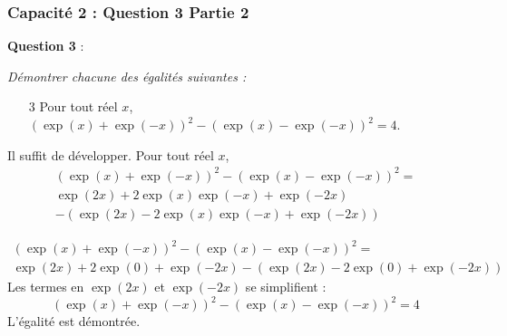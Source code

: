\documentclass[11pt, hyperref={urlcolor=red,%
            linkcolor=blue, %
            colorlinks=true}]{beamer}
\begin{document}
\begin{frame}
\frametitle{Capacité 2 : Question 3 Partie 2}

 \textbf{Question 3} : {\itshape Démontrer chacune des égalités suivantes :
\begin{enumerate}
	\item[3] Pour tout réel $x$, \:  $\left(\exp(x)+ \exp(-x)\right)^2-\left(\exp(x) - \exp(-x)\right)^2=4$.
\end{enumerate} 
}

Il suffit de développer. Pour tout réel $x$, \: 
\begin{multline*}
\left(\exp(x)+ \exp(-x)\right)^2-\left(\exp(x) - \exp(-x)\right)^2 =  \\
               \exp(2x) + 2 \exp(x)\exp(-x)+\exp(-2x) \\
               -\left(\exp(2x)-2\exp(x)\exp(-x)+\exp(-2x)\right)
\end{multline*}

\begin{multline*}
\left(\exp(x)+ \exp(-x)\right)^2-\left(\exp(x) - \exp(-x)\right)^2 = \\
\exp(2x) + 2 \exp(0)+\exp(-2x)-\left(\exp(2x)-2\exp(0)+\exp(-2x)\right)
\end{multline*}
Les termes en $\exp(2x)$ et $\exp(-2x)$ se simplifient :
\begin{equation*}
\left(\exp(x)+ \exp(-x)\right)^2-\left(\exp(x) - \exp(-x)\right)^2 = 4
\end{equation*}
L'égalité est démontrée.
\end{frame}

 
 
\end{document}
